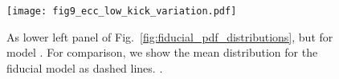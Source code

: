 \begin{figure}[htb]
    \centering
    \texttt{[image: fig9\_ecc\_low\_kick\_variation.pdf]}
    \caption{As lower left panel of Fig.~\ref{fig:fiducial_pdf_distributions}, but for model \modSigLower{}. For comparison, we show the mean distribution for the fiducial model as dashed lines. \href{https://github.com/TomWagg/detecting-DCOs-in-LISA/blob/main/paper/figures/fig9_ecc_low_kick_variation.pdf}{\faFileImage} \href{https://github.com/TomWagg/detecting-DCOs-in-LISA/blob/main/paper/figure_notebooks/variations.ipynb}{\faBook}.}
    \label{fig:ecc_low_kick_variation}
\end{figure}

